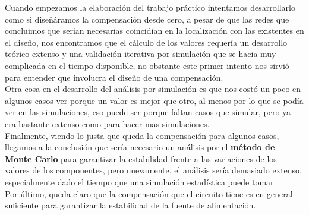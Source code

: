 
Cuando empezamos la elaboración del trabajo práctico intentamos desarrollarlo como si diseñáramos la compensación desde cero, a pesar de que las redes que concluimos que serían necesarias coincidían en la localización con las existentes en el diseño, nos encontramos que el cálculo de los valores requería un desarrollo teórico extenso y una validación iterativa por simulación que se hacia muy complicada en el tiempo disponible, no obstante este primer intento nos sirvió para entender que involucra el diseño de una compensación. \\
Otra cosa en el desarrollo del análisis por simulación es que nos costó un poco en algunos casos ver porque un valor es mejor que otro, al menos por lo que se podía ver en las simulaciones, eso puede ser porque faltan casos que simular, pero ya era bastante extenso como para hacer mas simulaciones. \\
Finalmente, viendo lo justa que queda la compensación para algunos casos, llegamos a la conclusión que sería necesario un análisis por el \textbf{método de Monte Carlo} para garantizar la estabilidad frente a las variaciones de los valores de los componentes, pero nuevamente, el análisis sería demasiado extenso, especialmente dado el tiempo que una simulación estadística puede tomar.\\
Por último, queda claro que la compensación que el circuito tiene es en general suficiente para garantizar la estabilidad de la fuente de alimentación.\\